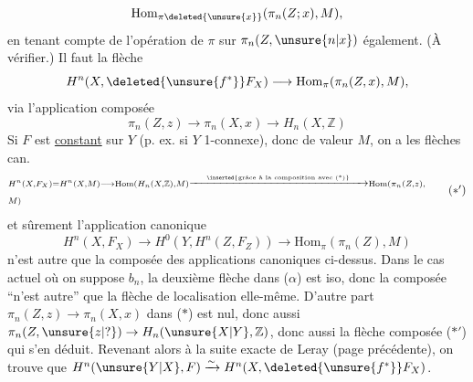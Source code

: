 \[
\mathrm{Hom}_{\pi\deleted{\unsure{x}}}(\pi_n(Z;x),M),
\]
en tenant compte de l'opération de $\pi$  sur $\pi_n(Z,\unsure{n|x})$ également. (À vérifier.) Il faut  la flèche
\[
H^n(X,\deleted{\unsure{f^*}}F_X)\longrightarrow\mathrm{Hom}_{\pi}(\pi_n(Z,x),M),
\]
via l'application composée
\[
\pi_n(Z,z)\longrightarrow\pi_n(X,x)\longrightarrow H_n(X,\mathbb Z)
\tag*{(*)}
\]
Si $F$ est \uline{constant} sur $Y$ (p. ex. si $Y$ 1-connexe), donc de valeur $M$, on a les flèches can.
\[
\begin{aligned}
&\scriptstyle H^n(X,F_X)=H^n(X,M)\longrightarrow\mathrm{Hom}(H_n(X,\mathbb Z),M)\xrightarrow{\inserted{\text{grâce à la composition avec (*)}}}\mathrm{Hom}(\pi_n(Z,z),\\
&\hfill\scriptstyle M)
\end{aligned}
\tag*{($*'$)}
\]
et sûrement  l'application canonique 
\[
H^n(X,F_X)\to H^0(Y,H^n(Z,F_Z))\to\mathrm{Hom}_\pi(\pi_n(Z),M)
\tag*{($\alpha$)}
\]
n'est autre que la  composée des applications canoniques ci-dessus. Dans le cas actuel où on suppose $b_n$, la deuxième flèche dans ($\alpha$) est iso, donc la composée ``n'est autre'' que la flèche de localisation elle-même.
D'autre part $\pi_n(Z,z)\to\pi_n(X,x)$ dans ($*$) est nul, donc aussi $\pi_n(Z,\unsure{z|?})\to H_n(\unsure{X|Y},\mathbb Z)$, donc aussi la flèche composée ($*'$) qui s'en déduit. Revenant alors à la suite exacte de Leray (page précédente), on trouve que $H^n(\unsure{Y|X},F)\xrightarrow{\sim}H^n(X,\deleted{\unsure{f^*}}F_X)$.

